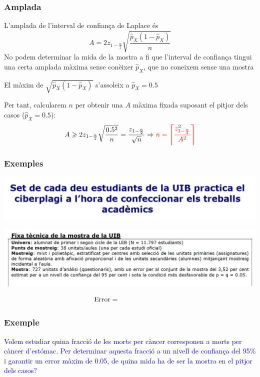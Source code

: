 \documentclass[12pt,t]{beamer}
\newcommand{\red}[1]{\textcolor{red}{#1}}
\newcommand{\blue}[1]{\textcolor{blue}{#1}}
\renewcommand{\emph}[1]{{\color{red}#1}}
\renewcommand{\geq}{\geqslant}
\theoremstyle{plain}
\theoremstyle{definition}
\begin{document}
\begin{frame}
\frametitle{Amplada}

L'amplada de l'interval de confiança de Laplace és
$$
A=2 z_{1-\frac{\alpha}{2}} \sqrt{\frac{\widehat{p}_{X} (1-\widehat{p}_{X})}{n}}
$$
No podem determinar la mida de la mostra a fi que l'interval de confiança tingui una certa amplada màxima sense
conèixer $\widehat{p}_{X}$, que no coneixem sense una mostra
\medskip

El màxim de $\sqrt{\widehat{p}_{X} (1-\widehat{p}_{X})}$ s'assoleix a $\widehat{p}_{X}=0.5$ 
\medskip

Per tant, calcularem $n$ per obtenir una $A$ màxima fixada suposant el pitjor dels casos ($\widehat{p}_{X}=0.5$):
$$
A\geq 2z_{1-\frac{\alpha}{2}}\sqrt{\frac{0.5^2}{n}}=\frac{z_{1-\frac{\alpha}{2}}}{\sqrt{n}}
\Rightarrow
\red{n=\left\lceil\frac{z_{1-\frac{\alpha}{2}}^2}{A^2}\right\rceil}
$$

\end{frame}


\begin{frame}
\frametitle{Exemples}

\begin{center}
\hspace*{-0.5cm}
\includegraphics[width=1.1\linewidth]{plagiUIB1.jpg}\bigskip

\hspace*{-0.5cm}\includegraphics[width=1.1\linewidth]{plagiUIB2.jpg}
\end{center}
$$
\mbox{Error}= \hphantom{\frac{1.96}{\sqrt{727}}\approx 0.0363}
$$
\end{frame}



\begin{frame}
\frametitle{Exemple}
\blue{Volem estudiar quina fracció de les morts per càncer corresponen a morts per càncer d'estómac. Per determinar aquesta fracció a un nivell de confiança del 95\% i garantir un error màxim de 0.05, de quina mida ha de ser la mostra \emph{en el pitjor dels casos}?}


\end{frame}
\end{document}
